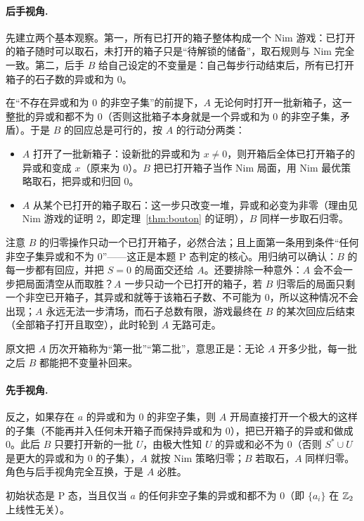 \sol \paragraph{后手视角.} 先建立两个基本观察。第一，所有已打开的箱子整体构成一个 Nim 游戏：已打开的箱子随时可以取石，未打开的箱子只是“待解锁的储备”，取石规则与 Nim 完全一致。第二，后手 $B$ 给自己设定的不变量是：自己每步行动结束后，所有已打开箱子的石子数的异或和为 $0$。

在“不存在异或和为 $0$ 的非空子集”的前提下，$A$ 无论何时打开一批新箱子，这一整批的异或和都不为 $0$（否则这批箱子本身就是一个异或和为 $0$ 的非空子集，矛盾）。于是 $B$ 的回应总是可行的，按 $A$ 的行动分两类：
\begin{itemize}
\item $A$ 打开了一批新箱子：设新批的异或和为 $x\ne0$，则开箱后全体已打开箱子的异或和变成 $x$（原来为 $0$）。$B$ 把已打开箱子当作 Nim 局面，用 Nim 最优策略取石，把异或和归回 $0$。
\item $A$ 从某个已打开的箱子取石：这一步只改变一堆，异或和必变为非零（理由见 Nim 游戏的证明 2，即定理~\ref{thm:bouton} 的证明），$B$ 同样一步取石归零。
\end{itemize}
注意 $B$ 的归零操作只动一个已打开箱子，必然合法；且上面第一条用到条件“任何非空子集异或和不为 $0$”——这正是本题 P 态判定的核心。用归纳可以确认：$B$ 的每一步都有回应，并把 $S=0$ 的局面交还给 $A$。还要排除一种意外：$A$ 会不会一步把局面清空从而取胜？$A$ 一步只动一个已打开的箱子，若 $B$ 归零后的局面只剩一个非空已开箱子，其异或和就等于该箱石子数、不可能为 $0$，所以这种情况不会出现；$A$ 永远无法一步清场，而石子总数有限，游戏最终在 $B$ 的某次回应后结束（全部箱子打开且取空），此时轮到 $A$ 无路可走。

原文把 $A$ 历次开箱称为“第一批”“第二批”，意思正是：无论 $A$ 开多少批，每一批之后 $B$ 都能把不变量补回来。

\paragraph{先手视角.} 反之，如果存在 $a$ 的异或和为 $0$ 的非空子集，则 $A$ 开局直接打开一个极大的这样的子集（不能再并入任何未开箱子而保持异或和为 $0$），把已开箱子的异或和做成 $0$。此后 $B$ 只要打开新的一批 $U$，由极大性知 $U$ 的异或和必不为 $0$（否则 $S^*\cup U$ 是更大的异或和为 $0$ 的子集），$A$ 就按 Nim 策略归零；$B$ 若取石，$A$ 同样归零。角色与后手视角完全互换，于是 $A$ 必胜。

\begin{theorem}[开箱子判定]\label{thm:boxnim}
初始状态是 P 态，当且仅当 $a$ 的任何非空子集的异或和都不为 $0$（即 $\{a_i\}$ 在 $\mathbb Z_2$ 上线性无关）。
\end{theorem}


